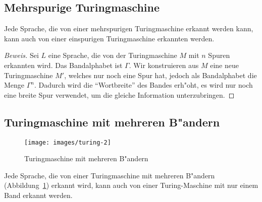 \subsection{Mehrspurige Turingmaschine}
\begin{satz}\label{mehrspurigeturingmaschine}
Jede Sprache, die von einer mehrspurigen Turingmaschine 
erkannt werden kann, kann auch von einer einspurigen Turingmaschine
erkannten werden.
\end{satz}

\begin{proof}[Beweis]
Sei $L$ eine Sprache, die von der Turingmaschine $M$ mit $n$ Spuren
erkannten wird. Das Bandalphabet ist $\Gamma$. Wir konstruieren aus
$M$ eine neue Turingmaschine $M'$, welches nur noch eine Spur hat,
jedoch als Bandalphabet die Menge $\Gamma^n$. Dadurch wird die ``Wortbreite'' 
des Bandes erh"oht, es wird nur noch eine breite Spur verwendet, um die
gleiche Information unterzubringen. 
\end{proof}

\subsection{Turingmaschine mit mehreren B"andern}
\begin{figure}
\begin{center}
\texttt{[image: images/turing-2]}
\end{center}
\caption{Turingmaschine mit mehreren B"andern\label{multitapetm}}
\end{figure}
\begin{satz}
\label{mehrbandturingmaschine}
Jede Sprache, die von einer Turingmaschine mit mehreren B"andern
(Abbildung~\ref{multitapetm})
erkannt
wird, kann auch von einer Turing-Maschine mit nur einem Band erkannt
werden.
\end{satz}

